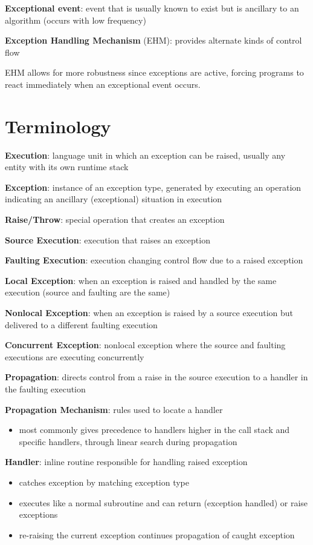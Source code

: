 \documentclass[11pt]{article}
\begin{document}
\textbf{Exceptional event}: event that is usually known to exist but is ancillary to an algorithm (occurs
with low frequency)

\textbf{Exception Handling Mechanism} (EHM): provides alternate kinds of control flow

EHM allows for more robustness since exceptions are active, forcing programs to react immediately when
an exceptional event occurs.
\section{Terminology}
\label{sec:org2f467bf}
\textbf{Execution}: language unit in which an exception can be raised, usually any entity with its own
runtime stack

\textbf{Exception}: instance of an exception type, generated by executing an operation indicating an
ancillary (exceptional) situation in execution

\textbf{Raise/Throw}: special operation that creates an exception

\textbf{Source Execution}: execution that raises an exception

\textbf{Faulting Execution}: execution changing control flow due to a raised exception

\textbf{Local Exception}: when an exception is raised and handled by the same execution (source and faulting are
the same)

\textbf{Nonlocal Exception}: when an exception is raised by a source execution but delivered to a different
faulting execution

\textbf{Concurrent Exception}: nonlocal exception where the source and faulting executions are executing
concurrently

\textbf{Propagation}: directs control from a raise in the source execution to a handler in the faulting
execution

\textbf{Propagation Mechanism}: rules used to locate a handler
\begin{itemize}
\item most commonly gives precedence to handlers higher in the call stack and specific handlers, through
linear search during propagation
\end{itemize}

\textbf{Handler}: inline routine responsible for handling raised exception
\begin{itemize}
\item catches exception by matching exception type
\item executes like a normal subroutine and can return (exception handled) or raise exceptions
\item re-raising the current exception continues propagation of caught exception
\end{itemize}
\end{document}
